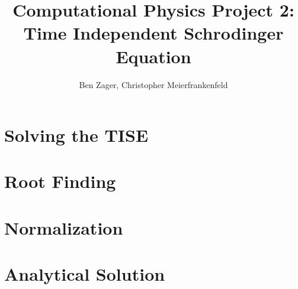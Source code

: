 \documentclass[12pt]{article}
\begin{document}
  
\title{Computational Physics Project 2: Time Independent Schrodinger Equation}
\author{Ben Zager, Christopher Meierfrankenfeld}
\maketitle
 
\section*{Solving the TISE}


\section*{Root Finding}


\section*{Normalization}

\section*{Analytical Solution}
\end{document}

